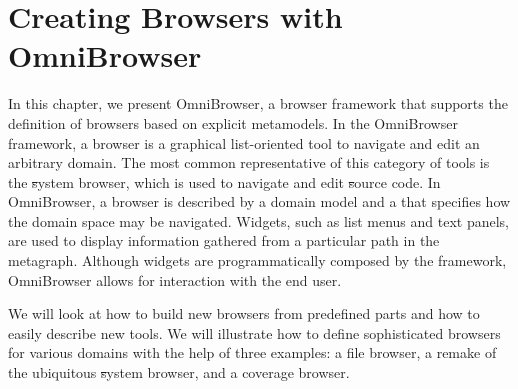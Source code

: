 \documentclass[a4paper,10pt,twoside]{book}
\begin{document}
	\sloppy
\fi

\newcommand{\ob}{Omni\-Brow\-ser\xspace}
\newcommand{\obf}{Omni\-Brow\-ser framework\xspace}
\newcommand{\applflab}{ApplFLab\xspace}


\chapter{Creating Browsers with OmniBrowser}



\noindent
In this chapter, we present \ob, a browser framework that supports the definition of browsers based on explicit metamodels. In the \obf, a browser is a graphical list-oriented tool to navigate and edit an arbitrary domain. The most common representative of this category of tools is the \st system browser, which is used to navigate and edit \st source code.
In \ob, a browser is described by a domain model and a  that specifies how the domain space may be navigated. Widgets, such as list menus and text panels, are used to display information gathered from a particular path in the metagraph. Although widgets are programmatically composed by the framework, \ob allows for interaction with the end user.
\indexmain{\ob}


We will look at how to build new browsers from predefined parts and how to easily describe new tools. We will illustrate how to define sophisticated browsers for various domains with the help of three examples: a file browser, a remake of the ubiquitous \st system browser, and a coverage browser.

\end{document}
